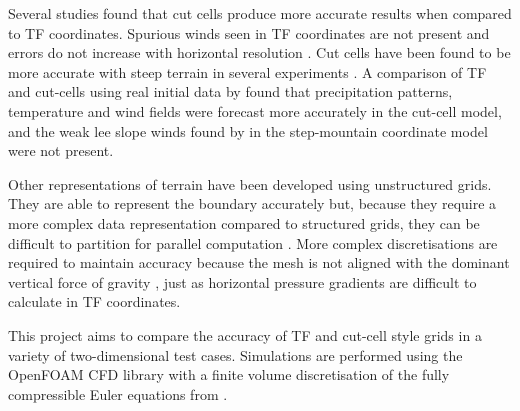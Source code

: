 Several studies found that cut cells produce more accurate results when compared to TF coordinates.  Spurious winds seen in TF coordinates are not present and errors do not increase with horizontal resolution \autocite{good2013}.  Cut cells have been found to be more accurate with steep terrain in several experiments \parencites{good2013}{yamazaki-satomura2010}.  A comparison of TF and cut-cells using real initial data by \textcite{steppeler2006} found that precipitation patterns, temperature and wind fields were forecast more accurately in the cut-cell model, and the weak lee slope winds found by \textcite{gallus-klemp2000} in the step-mountain coordinate model were not present.  

Other representations of terrain have been developed using unstructured grids.  They are able to represent the boundary accurately but, because they require a more complex data representation compared to structured grids, they can be difficult to partition for parallel computation \autocite{steppeler2003}.  More complex discretisations are required to maintain accuracy because the mesh is not aligned with the dominant vertical force of gravity \autocite{rosatti2005}, just as horizontal pressure gradients are difficult to calculate in TF coordinates.  



This project aims to compare the accuracy of TF and cut-cell style grids in a variety of two-dimensional test cases.  Simulations are performed using the OpenFOAM CFD library \autocite{openfoam} with a finite volume discretisation of the fully compressible Euler equations from \textcite{weller-shahrokhi2014}.  

